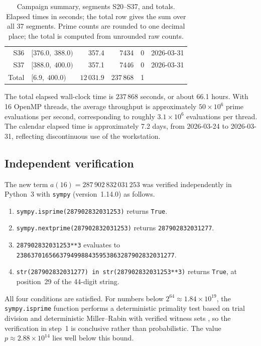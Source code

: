 \documentclass[11pt]{article}
\theoremstyle{definition}
\theoremstyle{remark}
\begin{document}
\begin{table}[ht]
\begin{center}
\begin{tabular}{rlrrrl}
S36 & $[376.0,\;388.0)$ & 357.4 & 7434 & 0 & 2026-03-31 \\
S37 & $[388.0,\;400.0)$ & 357.1 & 7446 & 0 & 2026-03-31 \\
\midrule
Total & $[6.9,\;400.0)$ & $12\,031.9$ & $237\,868$ & 1 & \\
\bottomrule
\end{tabular}
\caption{Campaign summary, segments S20--S37, and totals.
Elapsed times in seconds; the total row gives the sum over all 37
segments.
Prime counts are rounded to one decimal place; the total is computed
from unrounded raw counts.}
\label{tab:campaign_b}
\end{center}
\end{table}

The total elapsed wall-clock time is $237\,868$ seconds,
or about 66.1 hours.
With 16 OpenMP threads, the average throughput is approximately
$50 \times 10^6$ prime evaluations per second, corresponding to
roughly $3.1 \times 10^6$ evaluations per thread.
The calendar elapsed time is approximately 7.2 days, from
2026-03-24 to 2026-03-31, reflecting discontinuous use of the
workstation.

\subsection{Independent verification}
\label{sec:verification}

The new term $a(16) = 287\,902\,832\,031\,253$ was verified
independently in Python~3 with \texttt{sympy}
(version~1.14.0) as follows.

\begin{enumerate}
\item \texttt{sympy.isprime(287902832031253)} returns \texttt{True}.
\item \texttt{sympy.nextprime(287902832031253)} returns
      \texttt{287902832031277}.
\item \texttt{287902832031253**3} evaluates to\\
      \texttt{23863701656637949988435953863287902832031277}.
\item \texttt{str(287902832031277) in str(287902832031253**3)}
      returns \texttt{True}, at position~29 of the 44-digit string.
\end{enumerate}

All four conditions are satisfied.
For numbers below $2^{64} \approx 1.84 \times 10^{19}$,
the \texttt{sympy.isprime} function performs a deterministic
primality test based on trial division and deterministic
Miller--Rabin with verified witness sets \cite{SymPy},
so the verification in step~1 is conclusive rather than probabilistic.
The value $p \approx 2.88 \times 10^{14}$ lies well below this bound.
\end{document}
